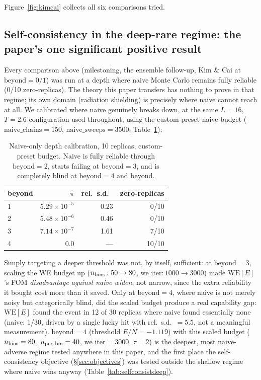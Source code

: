 \documentclass[11pt]{article}
\begin{document}
	Figure~\ref{fig:kimcai} collects all six comparisons tried.

	\subsection{Self-consistency in the deep-rare regime: the paper's one significant
		positive result}
	\label{sec:deeprare}
	Every comparison above (milestoning, the ensemble follow-up, Kim \& Cai at
	$\mathrm{beyond}=0/1$) was run at a depth where naive Monte Carlo remains fully
	reliable (0/10 zero-replicas). The theory this paper transfers has nothing to prove in
	that regime; its own domain (radiation shielding) is precisely where naive cannot reach
	at all. We calibrated where naive genuinely breaks down, at the same $L=16$, $T=2.6$
	configuration used throughout, using the custom-preset naive budget
	($\mathrm{naive\_chains}=150$, $\mathrm{naive\_sweeps}=3500$; Table~\ref{tab:deeprare}):

	\begin{table}[h]
		\centering\small
		\caption{Naive-only depth calibration, 10 replicas, custom-preset budget. Naive is
			fully reliable through $\mathrm{beyond}=2$, starts failing at $\mathrm{beyond}=3$,
			and is completely blind at $\mathrm{beyond}=4$ and beyond.}
		\label{tab:deeprare}
		\begin{tabular}{lrrr}
			\toprule
			beyond & $\hat\pi$ & rel.\ s.d.\ & zero-replicas \\
			\midrule
			1 & $5.29\times10^{-5}$ & 0.23 & 0/10 \\
			2 & $5.48\times10^{-6}$ & 0.46 & 0/10 \\
			3 & $7.14\times10^{-7}$ & 1.61 & 7/10 \\
			4 & $0.0$ & --- & 10/10 \\
			\bottomrule
		\end{tabular}
	\end{table}

	Simply targeting a deeper threshold was not, by itself, sufficient: at $\mathrm{beyond}=3$,
	scaling the WE budget up ($n_{\rm bins}:50\to80$, $\mathrm{we\_iter}:1000\to3000$) made
	$\mathrm{WE}[E]$'s FOM \emph{disadvantage against naive widen}, not narrow, since the
	extra reliability it bought cost more than it saved. Only at $\mathrm{beyond}=4$, where
	naive is not merely noisy but categorically blind, did the scaled budget produce a real
	capability gap: $\mathrm{WE}[E]$ found the event in 12 of 30 replicas where naive found
	essentially none (naive: 1/30, driven by a single lucky hit with rel.\ s.d.\ $=5.5$, not
	a meaningful measurement). $\mathrm{beyond}=4$ (threshold $E/N=-1.119$) with this scaled
	budget ($n_{\rm bins}=80$, $n_{\rm per\ bin}=40$, $\mathrm{we\_iter}=3000$, $\tau=2$) is
	the deepest, most naive-adverse regime tested anywhere in this paper, and the first
	place the self-consistency objective (\S\ref{sec:objectives}) was tested outside the
	shallow regime where naive wins anyway (Table~\ref{tab:selfconsistdeep}).
\end{document}
